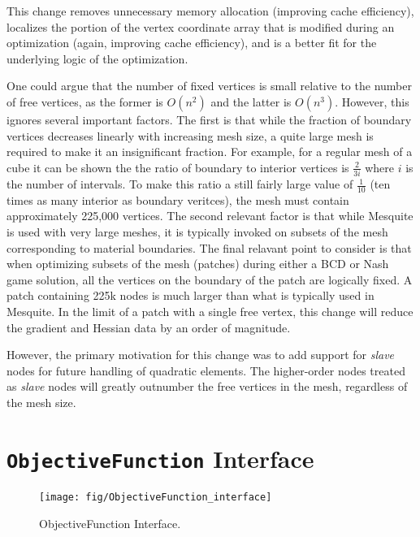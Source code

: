 \documentclass{article}
\begin{document}
This change removes unnecessary memory allocation (improving cache efficiency), localizes the portion of the vertex coordinate array that is modified during an optimization (again, improving cache efficiency), and is a better fit for the underlying logic of the optimization.  

One could argue that the number of fixed vertices is small relative to the number of free vertices, as the former is $O(n^2)$ and the latter is $O(n^3)$.  However, this ignores several important factors.  The first is that while the fraction of boundary vertices decreases linearly with increasing mesh size, a quite large mesh is required to make it an insignificant fraction.  For example, for a regular mesh of a cube it can be shown the the ratio of boundary to interior vertices is $\frac{2}{3i}$ where $i$ is the number of intervals.  To make this ratio a still fairly large value of $\frac{1}{10}$ (ten times as many interior as boundary veritces), the mesh must contain approximately 225,000 vertices.  The second relevant factor is that while Mesquite is used with very large meshes, it is typically invoked on subsets of the mesh corresponding to material boundaries.  The final relavant point to consider is that when optimizing subsets of the mesh (patches) during either a BCD or Nash game solution, all the vertices on the boundary of the patch are logically fixed.  A patch containing 225k nodes is much larger than what is typically used in Mesquite.  In the limit of a patch with a single free vertex, this change will reduce the gradient and Hessian data by an order of magnitude.

However, the primary motivation for this change was to add support for \emph{slave} nodes for future handling of quadratic elements.  The higher-order nodes treated as \emph{slave} nodes will greatly outnumber the free vertices in the mesh, regardless of the mesh size.  

\section{\texttt{ObjectiveFunction} Interface}
\label{sec:ofiface}

\begin{figure}[htb]
\begin{center}
\texttt{[image: fig/ObjectiveFunction\_interface]}
\caption{ObjectiveFunction Interface.\label{fig:ofiface}}
\end{center}
\end{figure}
\end{document}
